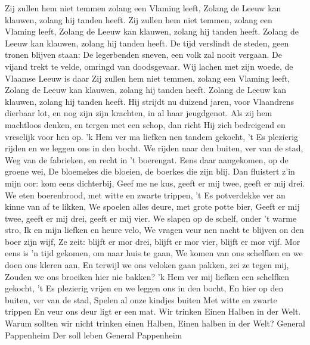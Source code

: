 \documentclass{article}
\begin{document}
\begin{songs}{}
Zij zullen hem niet temmen
\endverse
\beginverse*
zolang een Vlaming leeft,
Zolang de Leeuw kan klauwen, 
zolang hij tanden heeft.
Zij zullen hem niet temmen,
zolang een Vlaming leeft,
Zolang de Leeuw kan klauwen, 
zolang hij tanden heeft.
Zolang de Leeuw kan klauwen,
zolang hij tanden heeft.
\endverse
\beginverse*
De tijd verslindt de steden, 
geen tronen blijven staan:
De legerbenden sneven, 
een volk zal nooit vergaan.
De vijand trekt te velde, 
omringd van doodsgevaar.
Wij lachen met zijn woede, 
de Vlaamse Leeuw is daar
\endverse
\beginverse*
Zij zullen hem niet temmen,
zolang een Vlaming leeft,
Zolang de Leeuw kan klauwen, 
zolang hij tanden heeft.
Zolang de Leeuw kan klauwen, 
zolang hij tanden heeft.
\endverse
\beginverse*
Hij strijdt nu duizend jaren,
voor Vlaandrens dierbaar lot,
en nog zijn zijn krachten,
in al haar jeugdgenot.
Als zij hem machtloos denken,
en tergen met een schop,
dan richt Hij zich bedreigend
en vreselijk voor hen op.
\endverse
\endsong
{}
\beginverse*
'k Hem ver ma liefken nen tandem gekocht,
't Es plezierig rijden en we leggen ons in den bocht. 
We rijden naar den buiten, ver van de stad,
Weg van de fabrieken, en recht in 't boerengat.
\endverse
\beginverse*
Eens daar aangekomen, op de groene wei,
De bloemekes die bloeien, de boerkes die zijn blij.
Dan fluistert z’in mijn oor: kom eens dichterbij,
Geef me ne kus, geeft er mij twee, geeft er mij drei. 
\endverse
\beginverse*
We eten boerenbrood, met witte en zwarte trippen,
't Es potverdekke ver an kinne van af te likken,
We spoelen alles deure, met grote potte bier,
Geeft er mij twee, geeft er mij drei, geeft er mij vier. 
\endverse
\beginverse*
We slapen op de schelf, onder 't warme stro,
Ik en mijn liefken en heure velo,
We vragen veur nen nacht te blijven on den boer zijn wijf,
Ze zeit: blijft er mor drei, blijft er mor vier, blijft er mor vijf. 
\endverse
\beginverse*
Mor eens is 'n tijd gekomen, om naar huis te gaan,
We komen van ons schelfken en we doen ons kleren aan,
En terwijl we ons veloken gaan pakken, zei ze tegen mij,
Zouden we ons broeiken hier nie bakken?
\endverse
\beginverse*
'k Hem ver mij liefken een schelfken gekocht,
't Es plezierig vrijen en we leggen ons in den bocht,
En hier op den buiten, ver van de stad,
Spelen al onze kindjes buiten 
Met witte en zwarte trippen  
En veur ons deur ligt er een mat. 
\endverse
\endsong
{}
\beginverse*
Wir trinken
Einen Halben in der Welt.
Warum sollten wir nicht trinken einen Halben,
Einen halben in der Welt?
General Pappenheim 
Der soll leben           
General Pappenheim

\end{songs}
\end{document}
